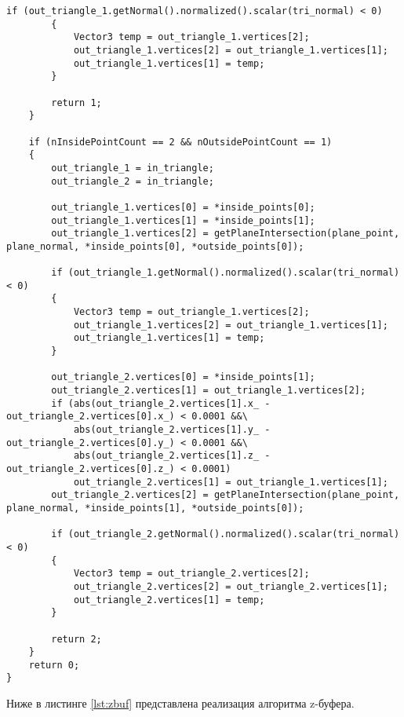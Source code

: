 \begin{lstlisting}[caption = Реализация общего алгоритма отрисовки, label = lst:clip]
        if (out_triangle_1.getNormal().normalized().scalar(tri_normal) < 0)
        {
            Vector3 temp = out_triangle_1.vertices[2];
            out_triangle_1.vertices[2] = out_triangle_1.vertices[1];
            out_triangle_1.vertices[1] = temp;
        }

        return 1;
    }

    if (nInsidePointCount == 2 && nOutsidePointCount == 1)
    {
        out_triangle_1 = in_triangle;
        out_triangle_2 = in_triangle;

        out_triangle_1.vertices[0] = *inside_points[0];
        out_triangle_1.vertices[1] = *inside_points[1];
        out_triangle_1.vertices[2] = getPlaneIntersection(plane_point, plane_normal, *inside_points[0], *outside_points[0]);

        if (out_triangle_1.getNormal().normalized().scalar(tri_normal) < 0)
        {
            Vector3 temp = out_triangle_1.vertices[2];
            out_triangle_1.vertices[2] = out_triangle_1.vertices[1];
            out_triangle_1.vertices[1] = temp;
        }

        out_triangle_2.vertices[0] = *inside_points[1];
        out_triangle_2.vertices[1] = out_triangle_1.vertices[2];
        if (abs(out_triangle_2.vertices[1].x_ - out_triangle_2.vertices[0].x_) < 0.0001 &&\
            abs(out_triangle_2.vertices[1].y_ - out_triangle_2.vertices[0].y_) < 0.0001 &&\
            abs(out_triangle_2.vertices[1].z_ - out_triangle_2.vertices[0].z_) < 0.0001)
            out_triangle_2.vertices[1] = out_triangle_1.vertices[1];
        out_triangle_2.vertices[2] = getPlaneIntersection(plane_point, plane_normal, *inside_points[1], *outside_points[0]);

        if (out_triangle_2.getNormal().normalized().scalar(tri_normal) < 0)
        {
            Vector3 temp = out_triangle_2.vertices[2];
            out_triangle_2.vertices[2] = out_triangle_2.vertices[1];
            out_triangle_2.vertices[1] = temp;
        }

        return 2;
    }
    return 0;
}
\end{lstlisting}

Ниже в листинге \ref{lst:zbuf} представлена реализация алгоритма z-буфера.

